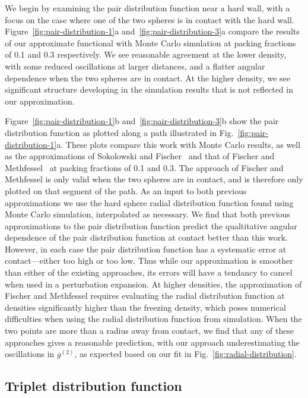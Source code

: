 \documentclass[letterpaper,twocolumn,amsmath,amssymb,pre,aps,10pt]{revtex4-1}
\begin{document}
We begin by examining the pair distribution function near a hard wall,
with a focus on the case where one of the two spheres is in contact
with the hard wall.  Figure~\ref{fig:pair-distribution-1}a
and~\ref{fig:pair-distribution-3}a compare the results of our
approximate functional with Monte Carlo simulation at packing
fractions of 0.1 and 0.3 respectively.  We see reasonable agreement at
the lower density, with some reduced oscillations at larger distances,
and a flatter angular dependence when the two spheres are in contact.
At the higher density, we see significant structure developing in the
simulation results that is not reflected in our approximation.

Figure~\ref{fig:pair-distribution-1}b
and~\ref{fig:pair-distribution-3}b show the pair distribution function
as plotted along a path illustrated in
Fig.~\ref{fig:pair-distribution-1}a.  These plots compare this work
with Monte Carlo results, as well as the approximations of Sokolowski
and Fischer~\cite{sokolowski1992role} and that of Fischer and
Methfessel~\cite{fischer1980born} at packing fractions of 0.1 and 0.3.
The approach of Fischer and Methfessel is only valid when the two
spheres are in contact, and is therefore only plotted on that segment
of the path.  As an input to both previous approximations we use the
hard sphere radial distribution function found using Monte Carlo
simulation, interpolated as necessary.  We find that both previous
approximations to the pair distribution function predict the
qualtitative angular dependence of the pair distribution function at
contact better than this work.  However, in each case the pair
distribution function has a systematic error at contact---either too
high or too low.  Thus while our approximation is smoother than either
of the existing approaches, its errors will have a tendancy to cancel
when used in a perturbation expansion.  At higher densities, the
approximation of Fischer and Methfessel requires evaluating the radial
distribution function at densities significantly higher than the
freezing density, which poses numerical difficulties when using the
radial distribution function from simulation.  When the two points are
more than a radius away from contact, we find that any of these
approaches gives a reasonable prediction, with our approach
underestimating the oscillations in $g^(2)$, as expected based on our
fit in Fig.~\ref{fig:radial-distribution}.

\subsection{Triplet distribution function}
\end{document}
